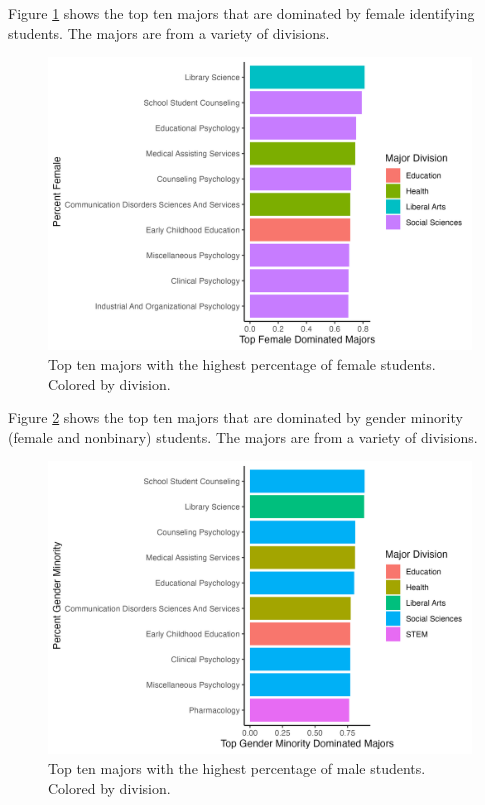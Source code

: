 \documentclass{article}
\begin{document}
Figure \ref{fig:femaledomgraph} shows the top ten majors that are dominated by female identifying students. The majors are from a variety of divisions.



\begin{figure}

{\centering \includegraphics[width=0.9\linewidth]{female_dom} 

}

\caption{Top ten majors with the highest percentage of female students. Colored by division.}\label{fig:femaledomgraph}
\end{figure}

Figure \ref{fig:genmindomgraph} shows the top ten majors that are dominated by gender minority (female and nonbinary) students. The majors are from a variety of divisions.



\begin{figure}

{\centering \includegraphics[width=0.9\linewidth]{gen_min_dom} 

}

\caption{Top ten majors with the highest percentage of male students. Colored by division.}\label{fig:genmindomgraph}
\end{figure}
\end{document}
